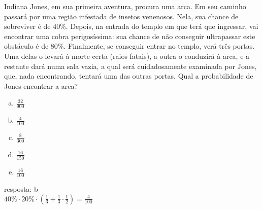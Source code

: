 \begin{ex}
 Indiana Jones, em sua primeira aventura, procura uma arca. Em seu caminho passará por uma região infestada de insetos venenosos. Nela, sua chance de sobreviver é de 40\%. Depois, na entrada do templo em que terá que ingressar, vai encontrar uma cobra perigosíssima: sua chance de não conseguir ultrapassar este obstáculo é de 80\%. Finalmente, se conseguir entrar no templo, verá três portas. Uma delas o levará à morte certa (raios fatais), a outra o conduzirá à arca, e a restante dará numa sala vazia, a qual será cuidadosamente examinada por Jones, que, nada encontrando, tentará uma das outras portas. Qual a probabilidade de Jones encontrar a arca?
    \begin{enumerate}[(a)]
    \item $\frac{32}{900}$
    \item $\frac{4}{100}$
    \item $\frac{8}{300}$
    \item $\frac{16}{150}$
    \item $\frac{16}{100}$
    \end{enumerate}
      \begin{sol}
       resposta: b \\
       $40\%\cdot20\%\cdot(\frac{1}{3}+\frac{1}{3}\cdot\frac{1}{2})=\frac{4}{100}$
      \end{sol}
\end{ex}